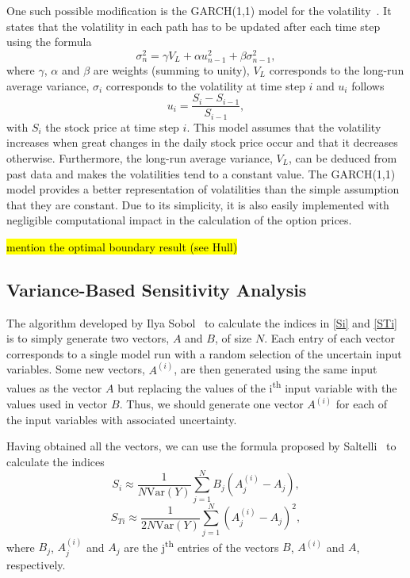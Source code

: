 \documentclass[a4paper,twocolumn,aps,prd,longbibliography,superscriptaddress]{revtex4-1}
\begin{document}
One such possible modification is the GARCH(1,1) model for the volatility~\citep{Hull}.
It states that the volatility in each path has to be updated after each time step using the formula
\begin{equation}
\sigma_n^2=\gamma V_L+\alpha u_{n-1}^2+\beta\sigma_{n-1}^2,
\end{equation}
\noindent where $\gamma$, $\alpha$ and $\beta$ are weights (summing to unity), $V_L$ corresponds to the long-run average variance, $\sigma_i$ corresponds to the volatility at time step $i$ and $u_i$ follows
\begin{equation}
u_i=\frac{S_i-S_{i-1}}{S_{i-1}},
\end{equation}
\noindent with $S_i$ the stock price at time step $i$.
This model assumes that the volatility increases when great changes in the daily stock price occur and that it decreases otherwise. Furthermore, the long-run average variance, $V_L$, can be deduced from past data and makes the volatilities tend to a constant value.
The GARCH(1,1) model provides a better representation of volatilities than the simple assumption that they are constant. Due to its simplicity, it is also easily implemented with negligible computational impact in the calculation of the option prices.

\hl{mention the optimal boundary result (see Hull)}

\subsection{Variance-Based Sensitivity Analysis}
The algorithm developed by Ilya Sobol~\cite{Sobol} to calculate the indices in \ref{Si} and \ref{STi} is to simply generate two vectors, $A$ and $B$, of size $N$. Each entry of each vector corresponds to a single model run with a random selection of the uncertain input variables.
Some new vectors, $A^{(i)}$, are then generated using the same input values as the vector $A$ but replacing the values of the i\textsuperscript{th} input variable with the values used in vector $B$. Thus, we should generate one vector $A^{(i)}$ for each of the input variables with associated uncertainty.

Having obtained all the vectors, we can use the formula proposed by Saltelli~\citep{Saltelli} to calculate the indices
\begin{equation}\label{Si2}
S_i\approx\frac{1}{N\mathrm{Var}(Y)}\sum_{j=1}^NB_j\left(A^{(i)}_j-A_j\right),
\end{equation}
\begin{equation}\label{STi2}
S_{Ti}\approx\frac{1}{2N\mathrm{Var}(Y)}\sum_{j=1}^N\left(A^{(i)}_j-A_j\right)^2,
\end{equation}
\noindent where $B_j$, $A^{(i)}_j$ and $A_j$ are the j\textsuperscript{th} entries of the vectors $B$, $A^{(i)}$ and $A$, respectively.
\end{document}
